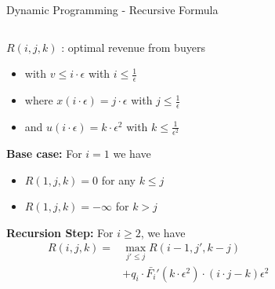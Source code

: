 \documentclass{beamer}
\begin{document}
\begin{frame}{Dynamic Programming - Recursive Formula}
  \begin{columns}
    \begin{column}{.6\textwidth}
      $R(i,j,k)$ : optimal revenue from buyers
      \begin{itemize}
        \item with $v \leq i \cdot \epsilon$ with $i \leq \frac{1}{\epsilon}$
        \item where $x(i \cdot \epsilon) = j \cdot \epsilon$ with $j \leq \frac{1}{\epsilon}$
        \item and $u(i \cdot \epsilon) = k \cdot \epsilon^2$ with $k \leq \frac{1}{\epsilon^2}$
      \end{itemize}

      \textbf{Base case:}
      For $i = 1$ we have
      \begin{itemize}
        \item $R(1,j,k) = 0$ for any $k \leq j$
        \item $R(1,j,k) = -\infty$ for $k > j$
      \end{itemize}

      \textbf{Recursion Step:}
      For $i \geq 2$, we have
      \begin{align*}
        R(i,j,k) = & \max_{j' \leq j} R(i-1, j', k-j) \\ &+ q_i \cdot \bar{F_i}'(k \cdot \epsilon^2)\cdot (i \cdot j - k)\epsilon^2
      \end{align*}
    \end{column}
    \begin{column}{.4\textwidth}
      \begin{center}
\end{center}
\end{column}
\end{columns}
\end{frame}
\end{document}
